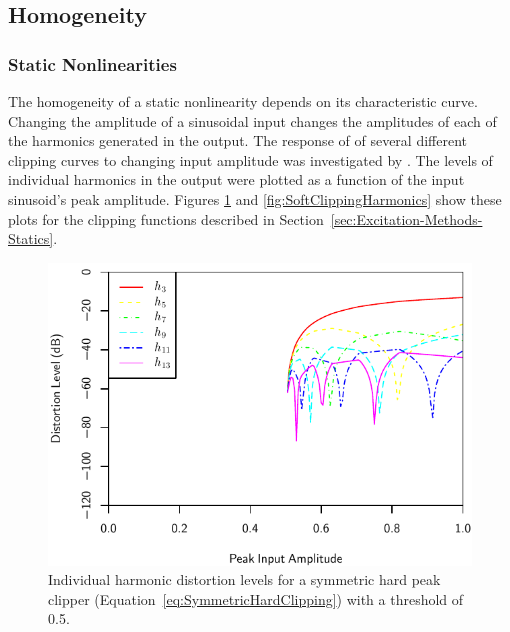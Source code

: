 	\subsection{Homogeneity}
	\label{sec:ExcitationEvaluation-Comparison-Homogeneity}
		\subsubsection*{Static Nonlinearities}
			The homogeneity of a static nonlinearity depends on its characteristic curve. Changing the
			amplitude of a sinusoidal input changes the amplitudes of each of the harmonics generated in the
			output. The response of of several different clipping curves to changing input amplitude was
			investigated by \citet{enderby2012harmonic}. The levels of individual harmonics in the output were
			plotted as a function of the input sinusoid's peak amplitude. Figures
			\ref{fig:HardClippingHarmonics} and \ref{fig:SoftClippingHarmonics} show these plots for the
			clipping functions described in Section~\ref{sec:Excitation-Methods-Statics}.

			\begin{figure}[h!]
				\centering
				\includegraphics{chapter5/Images/HardClippingHarmonics.pdf}
				\caption{Individual harmonic distortion levels for a symmetric hard peak clipper
					 (Equation~\ref{eq:SymmetricHardClipping}) with a threshold of 0.5.}
				\label{fig:HardClippingHarmonics}
			\end{figure}


